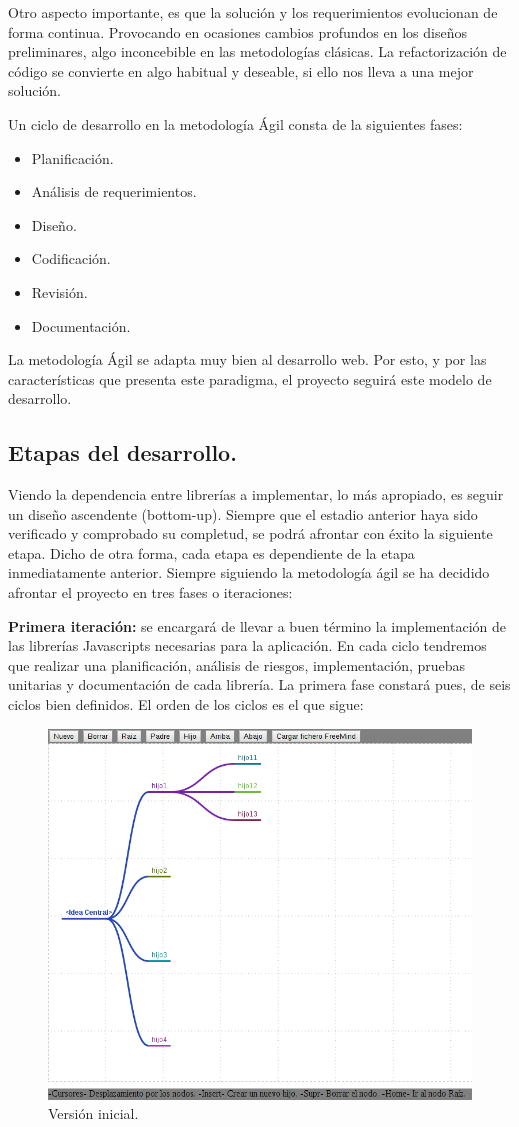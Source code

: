 Otro aspecto importante, es que la solución y los requerimientos evolucionan de forma continua. Provocando en ocasiones cambios profundos en los diseños preliminares, algo inconcebible en las metodologías clásicas. La refactorización de código se convierte en algo habitual y deseable, si ello nos lleva a una mejor solución.

Un ciclo de desarrollo en la metodología Ágil consta de la siguientes fases:

\begin{itemize}
\item Planificación.
\item Análisis de requerimientos.
\item Diseño.
\item Codificación.
\item Revisión.
\item Documentación.
\end{itemize}

La metodología Ágil se adapta muy bien al desarrollo web. Por esto, y por las características que presenta este paradigma, el proyecto seguirá este modelo de desarrollo.

\subsection{Etapas del desarrollo.}

Viendo la dependencia entre librerías a implementar, lo más apropiado, es seguir un diseño ascendente (bottom-up). Siempre que el estadio anterior haya sido verificado y comprobado su completud, se podrá afrontar con éxito la siguiente etapa. Dicho de otra forma, cada etapa es dependiente de la etapa inmediatamente anterior. Siempre siguiendo la metodología ágil se ha decidido afrontar el proyecto en tres fases o iteraciones:

\textbf{Primera iteración:} se encargará de llevar a buen término la implementación de las librerías Javascripts necesarias para la aplicación. En cada ciclo tendremos que realizar una planificación, análisis de riesgos, implementación, pruebas unitarias y documentación de cada librería. La primera fase constará pues, de seis ciclos bien definidos. El orden de los ciclos es el que sigue:

\begin{figure}[tbph]
\centering
\includegraphics[width=0.5\linewidth]{imagenes/primeraVersion1}
\caption{Versión inicial.}
\label{fig:versioninicial1}
\end{figure}


